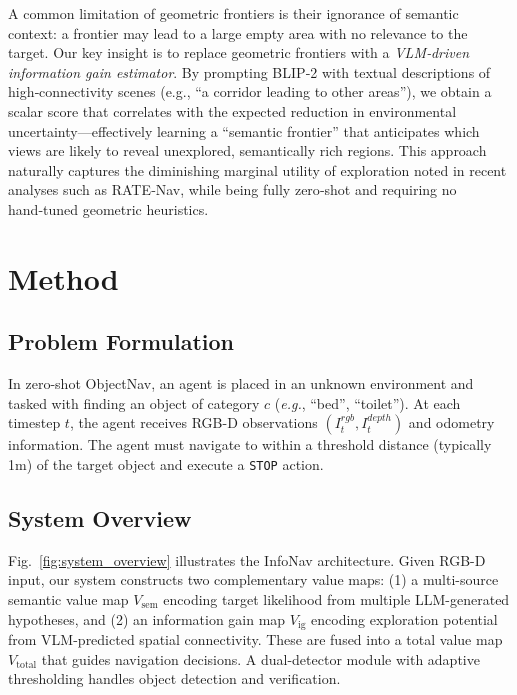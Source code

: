 \documentclass[conference]{IEEEtran}
\newcommand{\eg}{\textit{e.g.}}
\newcommand{\Vsem}{V_{\text{sem}}}
\newcommand{\Vig}{V_{\text{ig}}}
\newcommand{\Vtotal}{V_{\text{total}}}
\begin{document}
A common limitation of geometric frontiers is their ignorance of semantic context: a frontier may lead to a large empty area with no relevance to the target. Our key insight is to replace geometric frontiers with a \emph{VLM‑driven information gain estimator}. By prompting BLIP‑2 with textual descriptions of high‑connectivity scenes (e.g., “a corridor leading to other areas”), we obtain a scalar score that correlates with the expected reduction in environmental uncertainty—effectively learning a “semantic frontier” that anticipates which views are likely to reveal unexplored, semantically rich regions. This approach naturally captures the diminishing marginal utility of exploration noted in recent analyses such as RATE‑Nav, while being fully zero‑shot and requiring no hand‑tuned geometric heuristics.
\section{Method}
\label{sec:method}

\subsection{Problem Formulation}

In zero-shot ObjectNav, an agent is placed in an unknown environment and tasked with finding an object of category $c$ (\eg, ``bed'', ``toilet''). At each timestep $t$, the agent receives RGB-D observations $(I_t^{rgb}, I_t^{depth})$ and odometry information. The agent must navigate to within a threshold distance (typically 1m) of the target object and execute a \texttt{STOP} action.

\subsection{System Overview}

Fig.~\ref{fig:system_overview} illustrates the InfoNav architecture. Given RGB-D input, our system constructs two complementary value maps: (1) a multi-source semantic value map $\Vsem$ encoding target likelihood from multiple LLM-generated hypotheses, and (2) an information gain map $\Vig$ encoding exploration potential from VLM-predicted spatial connectivity. These are fused into a total value map $\Vtotal$ that guides navigation decisions. A dual-detector module with adaptive thresholding handles object detection and verification.
\end{document}

